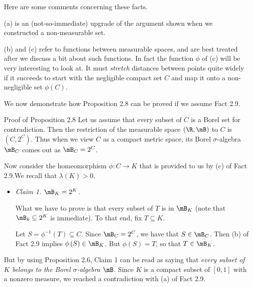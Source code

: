 \documentclass[pmath450]{subfiles}
\begin{document}
    \np Here are some comments concerning these facts.
    
    (a) is an (not-so-immediate) upgrade of the argument shown when we constructed a non-measurable set.

    (b) and (c) refer to functions between measurable spaces, and are best treated after we discuss a bit about such functions. In fact the function $\phi$ of (c) will be very interesting to look at. It must \textit{stretch} distances between points quite widely if it succeeds to start with the negligible compact set $C$ and map it onto a non-negligible set $\phi\left( C \right)$.

    We now demonstrate how Proposition 2.8 can be proved if we assume Fact 2.9. 

    \begin{boxyproof}{Proof of Proposition 2.8}
        Let us assume that every subset of $C$ is a Borel set for contradiction. Then the restriction of the measurable space $\left( \R,\mB \right)$ to $C$ is $\left( C,2^C \right)$. Thus when we view $C$ as a compact metric space, its Borel $\sigma$-algebra $\mB_C$ comes out as $\mB_C=2^C$.

        Now consider the homeomorphism $\phi:C\to K$ that is provided to us by (c) of Fact 2.9.\footnotemark[1] We recall that $\lambda\left( K \right)>0$.

        \begin{itemize}
            \item \textit{Claim 1. $\mB_K=2^K$.}

                \begin{subproof}
                    What we have to prove is that every subset of $T$ is in $\mB_K$ (note that $\mB_k\subseteq 2^K$ is immediate). To that end, fix $T\subseteq K$.

                    Let $S=\phi^{-1}\left( T \right)\subseteq C$. Since $\mB_C=2^{C}$, we have that $S\in\mB_C$. Then (b) of Fact 2.9 implies $\phi\left( S \right)\in\mB_K$. But $\phi\left( S \right)=T$, so that $T\in\mB_K$.
                \end{subproof}
        \end{itemize} 
        But by using Proposition 2.6, Claim 1 can be read as saying that \textit{every subset of $K$ belongs to the Borel $\sigma$-algebra $\mB$}. Since $K$ is a compact subset of $\left[ 0,1 \right]$ with a nonzero measure, we reached a contradiction with (a) of Fact 2.9.

        \noindent
        \begin{minipage}{\textwidth}
        \end{minipage}
    \end{boxyproof}
\end{document}
